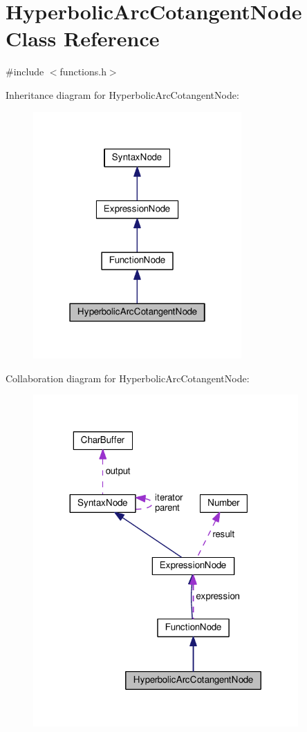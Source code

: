 \hypertarget{classHyperbolicArcCotangentNode}{}\section{Hyperbolic\+Arc\+Cotangent\+Node Class Reference}
\label{classHyperbolicArcCotangentNode}


{\ttfamily \#include $<$functions.\+h$>$}



Inheritance diagram for Hyperbolic\+Arc\+Cotangent\+Node\+:\nopagebreak
\begin{figure}[H]
\begin{center}
\leavevmode
\includegraphics[width=226pt]{classHyperbolicArcCotangentNode__inherit__graph}
\end{center}
\end{figure}


Collaboration diagram for Hyperbolic\+Arc\+Cotangent\+Node\+:\nopagebreak
\begin{figure}[H]
\begin{center}
\leavevmode
\includegraphics[width=287pt]{classHyperbolicArcCotangentNode__coll__graph}
\end{center}
\end{figure}
